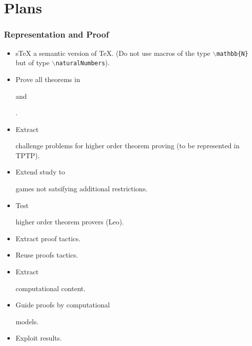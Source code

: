 \documentclass{beamer}
\def\sTeX{s\TeX{}}
\def\theorema{{\rm Theorema}} %
\def\isabelle{{\rm Isabelle}}
\def\leo{{\rm Leo}}
\def\mcolor#1#2{\rule{0ex}{0ex}\color{#1}#2\color{black}{}}
\begin{document}




\section{Plans}
\begin{frame}
\frametitle{Representation and Proof}
\begin{itemize}
   \item \mcolor{blue}{\sTeX} a semantic version of \TeX. (Do not use macros of the
type \texttt{$\backslash$mathbb\{N\}} but of type \texttt{$\backslash$naturalNumbers}).
   \item Prove all theorems in \mcolor{blue}{\theorema} and \mcolor{blue}{\isabelle}.
   \item Extract \mcolor{blue}{challenge problems} for higher order theorem proving
(to be represented in TPTP).\pause
   \item Extend study to \mcolor{blue}{games not satsifying additional restrictions}.\pause
   \item Test \mcolor{blue}{higher order theorem provers} (\leo).
   \item \mcolor{blue}{Extract proof tactics}.
   \item \mcolor{blue}{Reuse proofs tactics}.
   \item Extract \mcolor{blue}{computational content}.
   \item Guide proofs by computational \mcolor{blue}{models}.\pause
   \item \mcolor{blue}{Exploit results}.
\end{itemize}
\end{frame}
\end{document}
